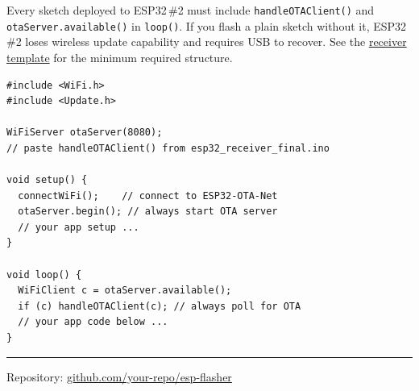 \documentclass[11pt, a4paper]{article}
\begin{document}
Every sketch deployed to ESP32\,\#2 must include \texttt{handleOTAClient()} and
\texttt{otaServer.available()} in \texttt{loop()}. If you flash a plain sketch
without it, ESP32\,\#2 loses wireless update capability and requires USB to
recover. See the
\href{https://github.com/your-repo/esp-flasher/blob/main/esp32_receiver/esp32_receiver_final.ino}%
{receiver template} for the minimum required structure.

\begin{lstlisting}[caption={Minimum required structure for every ESP32 \#2 firmware}]
#include <WiFi.h>
#include <Update.h>

WiFiServer otaServer(8080);
// paste handleOTAClient() from esp32_receiver_final.ino

void setup() {
  connectWiFi();    // connect to ESP32-OTA-Net
  otaServer.begin(); // always start OTA server
  // your app setup ...
}

void loop() {
  WiFiClient c = otaServer.available();
  if (c) handleOTAClient(c); // always poll for OTA
  // your app code below ...
}
\end{lstlisting}

\vspace{14pt}
\noindent\rule{\linewidth}{0.4pt}
\begin{center}
  \small Repository:
  \href{https://github.com/your-repo/esp-flasher}{github.com/your-repo/esp-flasher}
\end{center}
\end{document}
